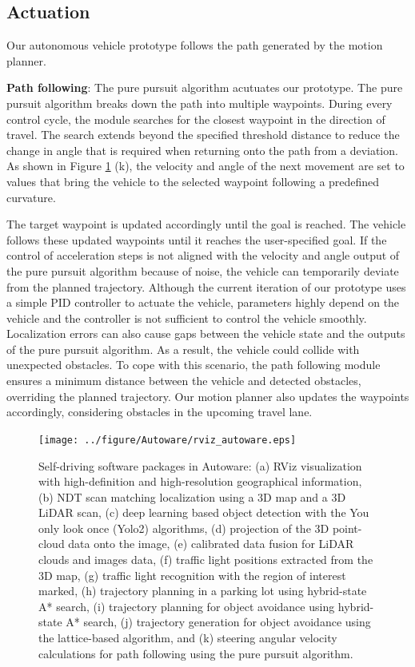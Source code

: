 \subsection{Actuation}
\label{sec:actuation}
Our autonomous vehicle prototype follows the path generated by the motion planner.

\textbf{Path following}:
The pure pursuit algorithm \cite{coulter1992implementation} acutuates our prototype.
The pure pursuit algorithm breaks down the path into multiple waypoints.
During every control cycle, the module searches for the closest waypoint in the direction of travel.
The search extends beyond the specified threshold distance to reduce the change in angle that is required when returning onto the path from a deviation.
As shown in Figure \ref{fig:rviz_autoware} (k), the velocity and angle of the next movement are set to values that bring the vehicle to the selected waypoint following a predefined curvature.

The target waypoint is updated accordingly until the goal is reached.
The vehicle follows these updated waypoints until it reaches the user-specified goal.
If the control of acceleration steps is not aligned with the velocity and angle output of the pure pursuit algorithm because of noise, the vehicle can temporarily deviate from the planned trajectory.
Although the current iteration of our prototype uses a simple PID controller to actuate the vehicle, parameters highly depend on the vehicle and the controller is not sufficient to control the vehicle smoothly.
Localization errors can also cause gaps between the vehicle state and the outputs of the pure pursuit algorithm.
As a result, the vehicle could collide with unexpected obstacles.
To cope with this scenario, the path following module ensures a minimum distance between the vehicle and detected obstacles, overriding the planned trajectory.
Our motion planner also updates the waypoints accordingly, considering obstacles in the upcoming travel lane.

\clearpage

\begin{figure}[thbp]
  \centering
  \texttt{[image: ../figure/Autoware/rviz\_autoware.eps]}
  \caption{\label{fig:rviz_autoware}
  Self-driving software packages in Autoware:
  (a) RViz visualization with high-definition and high-resolution geographical information,
  (b) NDT scan matching localization using a 3D map and a 3D LiDAR scan,
  (c) deep learning based object detection with the You only look once (Yolo2) algorithms,
  (d) projection of the 3D point-cloud data onto the image,
  (e) calibrated data fusion for LiDAR clouds and images data,
  (f) traffic light positions extracted from the 3D map,
  (g) traffic light recognition with the region of interest marked,
  (h) trajectory planning in a parking lot using hybrid-state A* search,
  (i) trajectory planning for object avoidance using hybrid-state A* search,
  (j) trajectory generation for object avoidance using the lattice-based algorithm, and
  (k) steering angular velocity calculations for path following using the pure pursuit algorithm.}
\end{figure}
